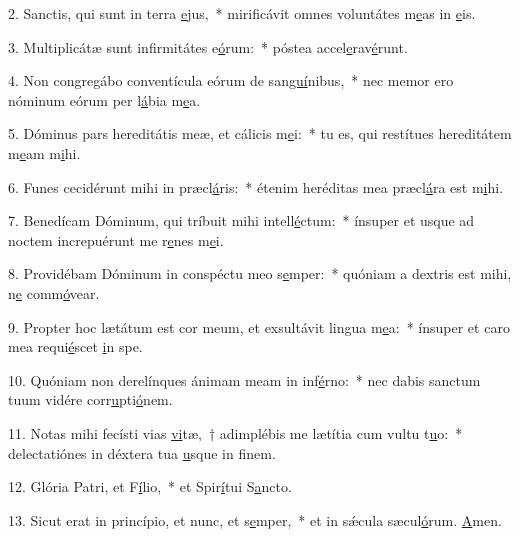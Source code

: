 2. Sanctis, qui sunt in terra \uline{e}jus,~* mirificávit omnes voluntátes m\uline{e}as in \uline{e}is.\par 
3. Multiplicátæ sunt infirmitátes e\uline{ó}rum:~* póstea accel\uline{e}rav\uline{é}runt.\par 
4. Non congregábo conventícula eórum de san\uline{guí}nibus,~* nec memor ero nóminum eórum per l\uline{á}bia m\uline{e}a.\par 
5. Dóminus pars hereditátis meæ, et cálicis m\uline{e}i:~* tu es, qui restítues hereditátem m\uline{e}am m\uline{i}hi.\par 
6. Funes cecidérunt mihi in præcl\uline{á}ris:~* étenim heréditas mea præcl\uline{á}ra est m\uline{i}hi.\par 
7. Benedícam Dóminum, qui tríbuit mihi intell\uline{é}ctum:~* ínsuper et usque ad noctem increpuérunt me r\uline{e}nes m\uline{e}i.\par 
8. Providébam Dóminum in conspéctu meo s\uline{e}mper:~* quóniam a dextris est mihi, n\uline{e} comm\uline{ó}vear.\par 
9. Propter hoc lætátum est cor meum, et exsultávit lingua m\uline{e}a:~* ínsuper et caro mea requi\uline{é}scet \uline{i}n spe.\par 
10. Quóniam non derelínques ánimam meam in inf\uline{é}rno:~* nec dabis sanctum tuum vidére corr\uline{u}pti\uline{ó}nem.\par 
11. Notas mihi fecísti vias \uline{vi}tæ,~† adimplébis me lætítia cum vultu t\uline{u}o:~* delectatiónes in déxtera tua \uline{u}sque in f\uline{i}nem.\par 
12. Glória Patri, et F\uline{í}lio,~* et Spir\uline{í}tui S\uline{a}ncto.\par 
13. Sicut erat in princípio, et nunc, et s\uline{e}mper,~* et in sǽcula sæcul\uline{ó}rum. \uline{A}men.\par 
